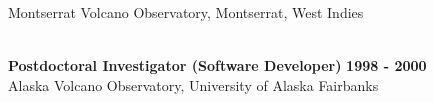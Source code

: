 \documentclass[margin,line]{res}
\begin{document}
\begin{resume}
Montserrat Volcano Observatory, Montserrat, West Indies %
\\
\begin{comment}
Led the seismic monitoring programme and the Operations Room at MVO. Served as Deputy Director.
Inherited a dysfunctional seismic monitoring programme which jeopardised public safety.
Built a robust seismic monitoring programme, tailored to detecting, locating and characterizing
rockfalls and pyroclastic flows in near-real-time. Merged existing analog and digital networks 
into a single virtual network. Developed alarm, analysis, web-based monitoring and archival 
systems. Recovered, securely archived, and databased all seismic data historically recorded by
MVO and made it available to researchers. Initiated research projects aimed at delivering
a better understanding of volcano-seismicity, and better seismic monitoring tools. 
\end{comment}
\begin{comment}
Real-time, round-the-clock monitoring of the Soufriere Hills Volcano eruption which recommenced in November 1999 and continued until July 2003. Ran the Operations Room by day and 24-hour surveillance of the volcano. Built the seismic monitoring programme, brought in new data acquisition systems, merged the analog and digital seismic networks, developed alarm systems, web-based monitoring tools and a broad suite of data analysis tools. Proposed an infrasound network and a Belham River monitoring network. Seamlessly managed the move to the new observatory in Dec 2002/Jan 2003 without any data loss. Recovered and securely archived and databased all seismic data and initiated numerous projects and collaborations with research scientists. Successfully obtained funding for a new digital network.
Real-time, round-the-clock monitoring of the Soufriere Hills Volcano eruption which recommenced in November 1999 and continued until July 2003. Ran the Operations Room by day and 24-hour surveillance of the volcano. Overhauled the entire seismic monitoring programme and refocused it on novel techniques to rapidly detect and characterize volcanic hazards.
\end{comment}
\\
%
{\bf Postdoctoral Investigator (Software Developer)} \hfill {\bf 1998 - 2000} \\
Alaska Volcano Observatory, University of Alaska Fairbanks\\
\begin{comment}
Supervisor: Stephen R. McNutt\\

\end{comment}
\end{resume}
\end{document}
